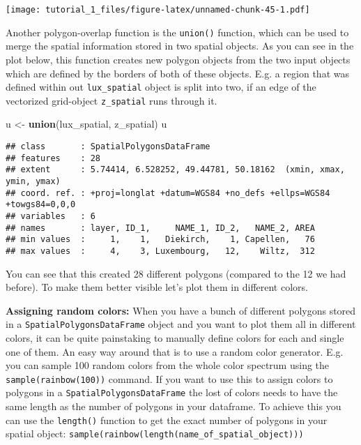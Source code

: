 \documentclass[]{article}
\newenvironment{Shaded}{\begin{snugshade}}{\end{snugshade}}
\newcommand{\KeywordTok}[1]{\textcolor[rgb]{0.13,0.29,0.53}{\textbf{#1}}}
\newcommand{\NormalTok}[1]{#1}
\newcommand{\StringTok}[1]{\textcolor[rgb]{0.31,0.60,0.02}{#1}}
\begin{document}
\texttt{[image: tutorial\_1\_files/figure-latex/unnamed-chunk-45-1.pdf]}

Another polygon-overlap function is the \texttt{union()} function, which
can be used to merge the spatial information stored in two spatial
objects. As you can see in the plot below, this function creates new
polygon objects from the two input objects which are defined by the
borders of both of these objects. E.g. a region that was defined within
out \texttt{lux\_spatial} object is split into two, if an edge of the
vectorized grid-object \texttt{z\_spatial} runs through it.

\begin{Shaded}
\begin{Highlighting}[]
\NormalTok{u <-}\StringTok{ }\KeywordTok{union}\NormalTok{(lux_spatial, z_spatial)}
\NormalTok{u}
\end{Highlighting}
\end{Shaded}

\begin{verbatim}
## class       : SpatialPolygonsDataFrame 
## features    : 28 
## extent      : 5.74414, 6.528252, 49.44781, 50.18162  (xmin, xmax, ymin, ymax)
## coord. ref. : +proj=longlat +datum=WGS84 +no_defs +ellps=WGS84 +towgs84=0,0,0 
## variables   : 6
## names       : layer, ID_1,     NAME_1, ID_2,   NAME_2, AREA 
## min values  :     1,    1,   Diekirch,    1, Capellen,   76 
## max values  :     4,    3, Luxembourg,   12,    Wiltz,  312
\end{verbatim}

You can see that this created 28 different polygons (compared to the 12
we had before). To make them better visible let's plot them in different
colors.

\textbf{Assigning random colors:} When you have a bunch of different
polygons stored in a \texttt{SpatialPolygonsDataFrame} object and you
want to plot them all in different colors, it can be quite painstaking
to manually define colors for each and single one of them. An easy way
around that is to use a random color generator. E.g. you can sample 100
random colors from the whole color spectrum using the
\texttt{sample(rainbow(100))} command. If you want to use this to assign
colors to polygons in a \texttt{SpatialPolygonsDataFrame} the lost of
colors needs to have the same length as the number of polygons in your
dataframe. To achieve this you can use the \texttt{length()} function to
get the exact number of polygons in your spatial object:
\texttt{sample(rainbow(length(name\_of\_spatial\_object)))}
\end{document}

